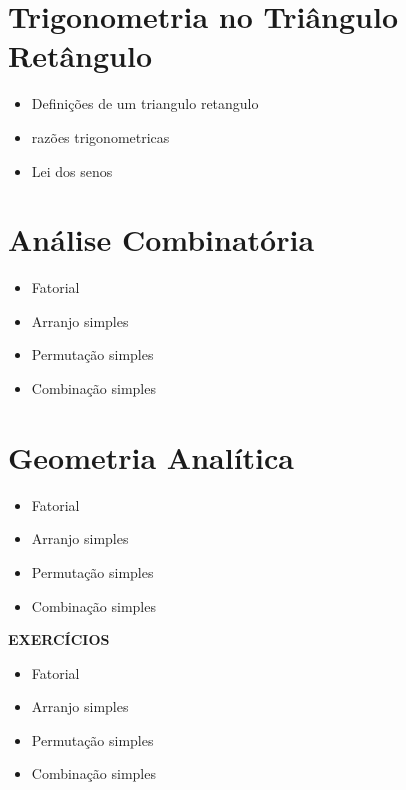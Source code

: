 \documentclass[11pt,fleqn]{book}
\begin{document}
\section{Trigonometria no Triângulo Retângulo}

	\begin{itemize}
		\item   Definições de um triangulo retangulo
		\item razões trigonometricas
		\item Lei dos senos
	\end{itemize}

\section{Análise Combinatória}%

	\begin{itemize}
		\item Fatorial
		\item Arranjo simples
		\item Permutação simples
		\item Combinação simples
	\end{itemize}

\section{Geometria Analítica}%
	\begin{itemize}
		\item Fatorial
		\item Arranjo simples
		\item Permutação simples
		\item Combinação simples
	\end{itemize}

	\begin{center}
		\textbf{EXERCÍCIOS}
	\end{center}

	\begin{itemize}
		\item Fatorial
		\item Arranjo simples
		\item Permutação simples
		\item Combinação simples
	\end{itemize}
\end{document}
